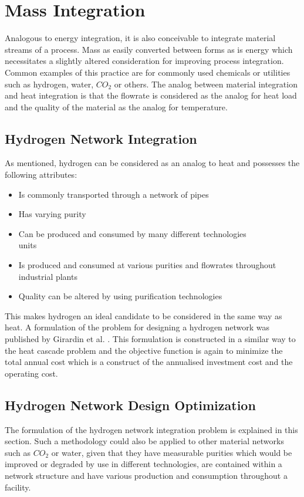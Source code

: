 \section{Mass Integration}

Analogous to energy integration, it is also conceivable to integrate material streams of a process. Mass as easily converted between forms as is energy which necessitates a slightly altered consideration for improving process integration. Common examples of this practice are for commonly used chemicals or utilities such as hydrogen, water, $CO_2$ or others. The analog between material integration and heat integration is that the flowrate is considered as the analog for heat load and the quality of the material as the analog for temperature. 

\subsection{Hydrogen Network Integration}
As mentioned, hydrogen can be considered as an analog to heat and possesses the following attributes:
\begin{itemize}
\item Is commonly transported through a network of pipes
\item Has varying purity
\item Can be produced and consumed by many different technologies\\units
\item Is produced and consumed at various purities and flowrates throughout industrial plants
\item Quality can be altered by using purification technologies
\end{itemize}

This makes hydrogen an ideal candidate to be considered in the same way as heat. A formulation of the problem for designing a hydrogen network was published by Girardin et al. \cite{girardin_methodology_2006}. This formulation is constructed in a similar way to the heat cascade problem and the objective function is again to minimize the total annual cost which is a construct of the annualised investment cost and the operating cost.

\subsection{Hydrogen Network Design Optimization}
The formulation of the hydrogen network integration problem is explained in this section. Such a methodology could also be applied to other material networks such as $CO_2$ or water, given that they have measurable purities which would be improved or degraded by use in different technologies, are contained within a network structure and have various production and consumption throughout a facility.  